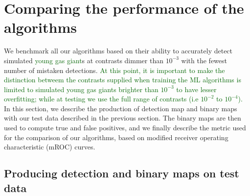\documentclass[referee]{aa} %
\newcommand{\newchange}[1]{\textcolor{darkgreen}{#1}}
\begin{document}
\section{Comparing the performance of the algorithms}\label{sec:results}

We benchmark all our algorithms based on their ability to accurately detect simulated \newchange{young gas giant}s at contrasts dimmer than $10^{-3}$ with the fewest number of mistaken detections.
\newchange{At this point, it is important to make the distinction betweem the contrasts supplied when training the ML algorithms is limited to simulated young gas giants brighter than $10^{-3}$ to have lesser overfitting; while at testing we use the full range of contrasts (i.e $10^{-2}$ to $10^{-4}$).}
In this section, we describe the production of detection map and binary maps with our test data described in the previous section.
The binary maps are then used to compute true and false positives, and we finally describe the metric used for the comparison of our algorithms, based on modified receiver operating characteristic (mROC) curves.


\subsection{Producing detection and binary maps on test data}\label{sec:testdata}
\end{document}
